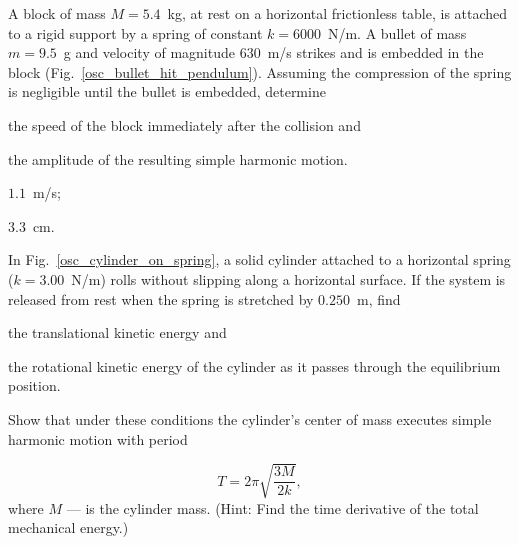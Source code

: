 \begin{problem}\label{prb:osc_bullet_hit_pendulum}
	A block of mass $M = 5.4$~kg, at rest on a horizontal frictionless table, is attached to a rigid support by a spring of constant $k = 6000$~N/m. A bullet of mass $m = 9.5$~g and velocity of magnitude $630$~m/s strikes and is embedded in the block (Fig.~\ref{osc_bullet_hit_pendulum}). Assuming the compression of the spring is negligible until the bullet is embedded, determine 
	\begin{enumerate*}[label=(\alph*)]
		\item the speed of the block immediately after the collision and
		\item the amplitude of the resulting simple harmonic motion.
	\end{enumerate*}
	\begin{solution}
		\begin{enumerate*}[label=(\alph*)]
			\item $1.1$~m/s; 
			\item $3.3$~cm.
		\end{enumerate*}
	\end{solution}
\end{problem}


\begin{problem}\label{prb:osc_cylinder_on_spring}
	In Fig.~\ref{osc_cylinder_on_spring}, a solid cylinder attached to a horizontal spring ($k = 3.00$~N/m) rolls without slipping along a horizontal surface. If the system is released from rest when the spring is stretched by $0.250$~m, find 
	\begin{enumerate*}[label=(\alph*)]
		\item the translational kinetic energy and 
		\item the rotational kinetic energy of the cylinder as it passes through the equilibrium position.
		\item Show that under these conditions the cylinder's center of mass executes simple harmonic motion with period
	\end{enumerate*}
		\[
		T = 2\pi\sqrt{\frac{3M}{2k}},
		\]
	where $M$ --- is the cylinder mass. (Hint: Find the time derivative of the total mechanical energy.)
\end{problem}


